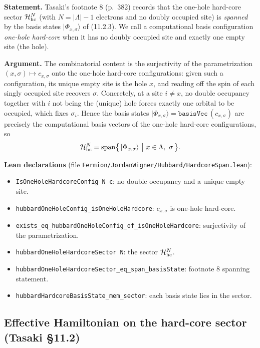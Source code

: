 \documentclass[a4paper,11pt]{article}
\begin{document}
\noindent\textbf{Statement.}
Tasaki's footnote 8 (p.~382) records that the one-hole hard-core sector
\(\mathcal H_{\rm hc}^{N}\) (with \(N=|\Lambda|-1\) electrons and no doubly
occupied site) is \emph{spanned} by the basis states \(|\Phi_{x,\sigma}\rangle\)
of (11.2.3). We call a computational basis configuration \emph{one-hole
hard-core} when it has no doubly occupied site and exactly one empty site (the
hole).

\medskip
\noindent\textbf{Argument.}
The combinatorial content is the surjectivity of the parametrization
\((x,\sigma)\mapsto c_{x,\sigma}\) onto the one-hole hard-core configurations:
given such a configuration, its unique empty site is the hole \(x\), and reading
off the spin of each singly occupied site recovers \(\sigma\). Concretely, at a
site \(i\neq x\), no double occupancy together with \(i\) not being the (unique)
hole forces exactly one orbital to be occupied, which fixes \(\sigma_i\). Hence
the basis states \(|\Phi_{x,\sigma}\rangle = \mathtt{basisVec}\,(c_{x,\sigma})\)
are precisely the computational basis vectors of the one-hole hard-core
configurations, so
\[
  \mathcal H_{\rm hc}^{N}
    = \operatorname{span}\bigl\{\,|\Phi_{x,\sigma}\rangle \ \big|\ x\in\Lambda,\
      \sigma\,\bigr\}.
\]

\medskip
\noindent\textbf{Lean declarations}
(file \texttt{Fermion/JordanWigner/Hubbard/HardcoreSpan.lean}):
\begin{itemize}
  \item \texttt{IsOneHoleHardcoreConfig N c}: no double occupancy and a unique
    empty site.
  \item \texttt{hubbardOneHoleConfig\_isOneHoleHardcore}: \(c_{x,\sigma}\) is
    one-hole hard-core.
  \item \texttt{exists\_eq\_hubbardOneHoleConfig\_of\_isOneHoleHardcore}:
    surjectivity of the parametrization.
  \item \texttt{hubbardOneHoleHardcoreSector N}: the sector
    \(\mathcal H_{\rm hc}^{N}\).
  \item \texttt{hubbardOneHoleHardcoreSector\_eq\_span\_basisState}: footnote 8
    spanning statement.
  \item \texttt{hubbardHardcoreBasisState\_mem\_sector}: each basis state lies in
    the sector.
\end{itemize}

\subsection{Effective Hamiltonian on the hard-core sector (Tasaki §11.2)}
\label{subsec:hubbard-effective-hamiltonian}
\end{document}
